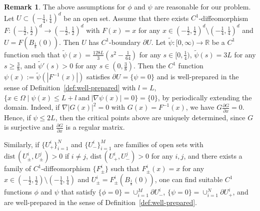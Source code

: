 \documentclass{amsart}
\theoremstyle{definition}
\newtheorem{remark}[definition]{Remark}
\def\R{{\mathbb{R}}}
\newcommand{\dist}{\mathrm{dist}\,}
\begin{document}
\begin{remark}
The above assumptions for $\phi$ and $\psi$ are reasonable for our problem.
Let $U \subset (-\frac{1}{4},\frac{1}{4})^d$ be an open set. Assume that
there exists $C^1$-diffeomorphism $F : (-\frac{1}{2}, \frac{1}{2})^d \to (-\frac{1}{2}, \frac{1}{2})^d$ with 
$F (x)=x$ for any $x \in (-\frac{1}{2}, \frac{1}{2})^d\setminus (-\frac{1}{4}, \frac{1}{4})^d$
and $U=F(B_\frac18 (0))$. 
Then $U$ has $C^1$-boundary $\partial U$.
Let $\tilde \psi: [0, \infty) \to \R$
be a $C^1$ function such that $\tilde \psi (x)= \frac{128 L}{3} (s^2 - \frac{1}{64})$ for any $s \in [0,\frac14)$, $\tilde \psi (s)= 3L$ for any $s \geq \frac{3}{8}$, and $\tilde \psi' (s)>0$ for any $s \in (0,\frac38)$. Then the $C^1$ function $\psi (x) :=\tilde \psi (|F^{-1} (x)|)$ satisfies 
$\partial U =\{\psi=0\}$
and is well-prepared in the sense of Definition~\ref{def:well-prepared} with $l=L$, $\{ x \in \Omega \mid \psi (x) \leq L+l \ \text{and} \
    |\nabla \psi (x)|=0 \}=\{0\}$, by periodically extending the domain.
Indeed, if $\nabla |G(x)|^2=0$ with $G(x)=F^{-1} (x)$,
we have 
$G \frac{\partial G}{\partial x} =0$. 
Hence, if $\psi \leq 2L$, then the critical points above are uniquely determined, since $G$ is surjective and $\frac{\partial G}{\partial x}$ is a regular matrix.

Similarly, if $\{U^i _+ \}_{i=1} ^N$ and $\{ 
U^i _- \}_{i=1} ^M$ are  families of open sets with 
$\dist (U_\pm ^i,U_\pm ^j)>0$ if $i\not =j$, $\dist (U_+ ^i,U_- ^j)>0$ for any $i,j$, and there exists a family of
$C^1$-diffeomorphism $\{F_\pm ^i\}$
such that $F^i _\pm (x)=x$ for any $x \in (-\frac{1}{2}, \frac{1}{2})\setminus (-\frac{1}{4}, \frac{1}{4})$ and $U_\pm ^i = F_\pm ^i (B_\frac18 (0))$, one can find suitable $C^1$ functions $\phi$ and $\psi$ that satisfy $\{ \phi =0\}=\cup_{i=1} ^M \partial U_- ^i$, $\{ \psi =0\}=\cup_{i=1} ^N \partial U_+ ^i$, and are well-prepared in the sense of Definition~\ref{def:well-prepared}.
\end{remark}
\end{document}
